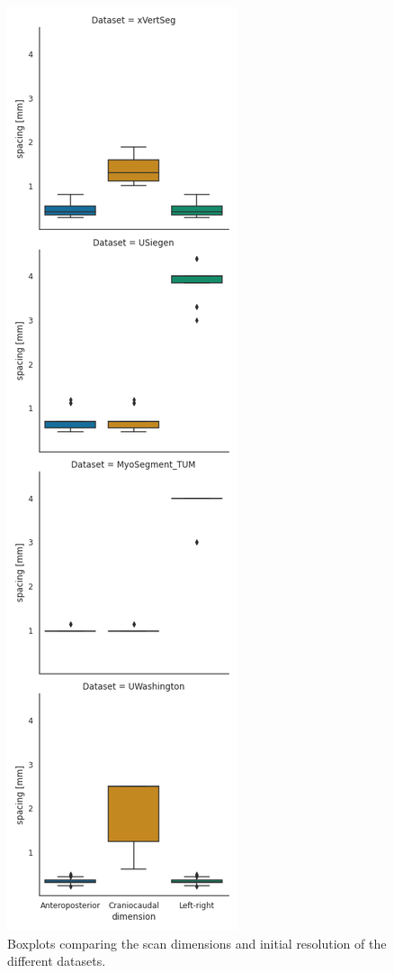 \begin{figure}
\begin{minipage}{.45\textwidth}
    \end{minipage}%
    \begin{minipage}{0.45\textwidth}
        \includegraphics[width=.98\textwidth]{automated_graphs/AllDataset_SpacingBoxplot.png}
    \end{minipage}
    \caption{Boxplots comparing the scan dimensions and initial resolution of the different datasets.}
    \label{fig:AllDataset_dims}
\end{figure}

